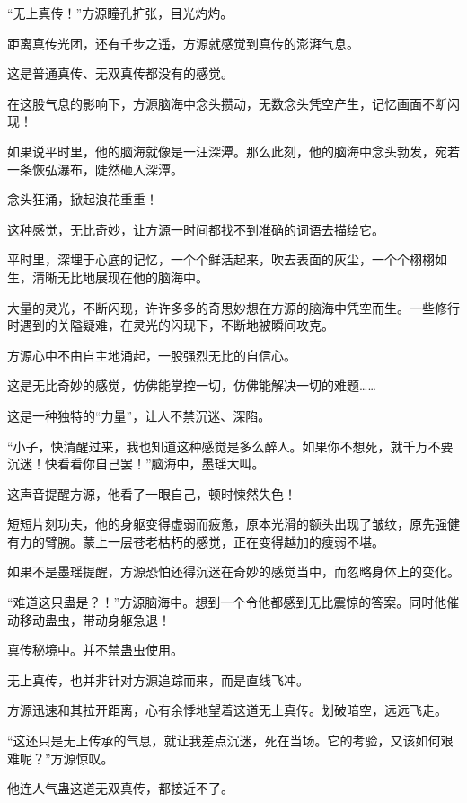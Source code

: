 
\begin{this_body}

“无上真传！”方源瞳孔扩张，目光灼灼。

距离真传光团，还有千步之遥，方源就感觉到真传的澎湃气息。

这是普通真传、无双真传都没有的感觉。

在这股气息的影响下，方源脑海中念头攒动，无数念头凭空产生，记忆画面不断闪现！

如果说平时里，他的脑海就像是一汪深潭。那么此刻，他的脑海中念头勃发，宛若一条恢弘瀑布，陡然砸入深潭。

念头狂涌，掀起浪花重重！

这种感觉，无比奇妙，让方源一时间都找不到准确的词语去描绘它。

平时里，深埋于心底的记忆，一个个鲜活起来，吹去表面的灰尘，一个个栩栩如生，清晰无比地展现在他的脑海中。

大量的灵光，不断闪现，许许多多的奇思妙想在方源的脑海中凭空而生。一些修行时遇到的关隘疑难，在灵光的闪现下，不断地被瞬间攻克。

方源心中不由自主地涌起，一股强烈无比的自信心。

这是无比奇妙的感觉，仿佛能掌控一切，仿佛能解决一切的难题……

这是一种独特的“力量”，让人不禁沉迷、深陷。

“小子，快清醒过来，我也知道这种感觉是多么醉人。如果你不想死，就千万不要沉迷！快看看你自己罢！”脑海中，墨瑶大叫。

这声音提醒方源，他看了一眼自己，顿时悚然失色！

短短片刻功夫，他的身躯变得虚弱而疲惫，原本光滑的额头出现了皱纹，原先强健有力的臂腕。蒙上一层苍老枯朽的感觉，正在变得越加的瘦弱不堪。

如果不是墨瑶提醒，方源恐怕还得沉迷在奇妙的感觉当中，而忽略身体上的变化。

“难道这只蛊是？！”方源脑海中。想到一个令他都感到无比震惊的答案。同时他催动移动蛊虫，带动身躯急退！

真传秘境中。并不禁蛊虫使用。

无上真传，也并非针对方源追踪而来，而是直线飞冲。

方源迅速和其拉开距离，心有余悸地望着这道无上真传。划破暗空，远远飞走。

“这还只是无上传承的气息，就让我差点沉迷，死在当场。它的考验，又该如何艰难呢？”方源惊叹。

他连人气蛊这道无双真传，都接近不了。


\end{this_body}
